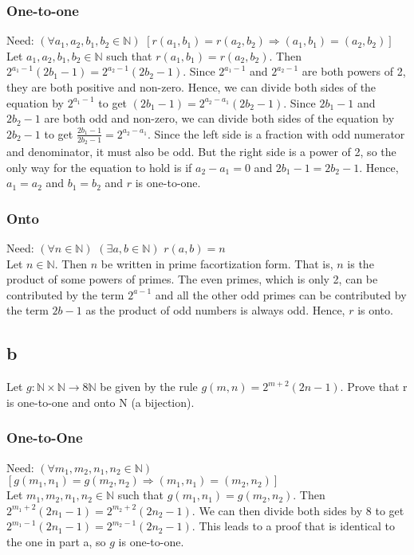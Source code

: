 \documentclass{article}
\begin{document}
\subsubsection*{One-to-one}
Need: $(\forall a_1,a_2,b_1,b_2 \in \mathbb{N})$ $[r(a_1, b_1) = r(a_2, b_2) \Rightarrow (a_1, b_1) = (a_2, b_2)]$ \\
Let $a_1, a_2, b_1, b_2 \in \mathbb{N}$ such that $r(a_1, b_1) = r(a_2, b_2)$. Then $2^{a_1-1}(2b_1-1) = 2^{a_2-1}(2b_2-1)$. Since $2^{a_1-1}$ and $2^{a_2-1}$ are both powers of 2, they are both positive and non-zero. Hence, we can divide both sides of the equation by $2^{a_1-1}$ to get $(2b_1-1) = 2^{a_2-a_1}(2b_2-1)$. Since $2b_1-1$ and $2b_2-1$ are both odd and non-zero, we can divide both sides of the equation by $2b_2-1$ to get $\frac{2b_1-1}{2b_2-1} = 2^{a_2-a_1}$. Since the left side is a fraction with odd numerator and denominator, it must also be odd. But the right side is a power of 2, so the only way for the equation to hold is if $a_2-a_1 = 0$ and $2b_1-1 = 2b_2-1$. Hence, $a_1 = a_2$ and $b_1 = b_2$ and $r$ is one-to-one. 
\subsubsection*{Onto}
Need: $(\forall n \in \mathbb{N})$ $(\exists a, b \in \mathbb{N})$ $r(a, b) = n$ \\
Let $n \in \mathbb{N}$. Then $n$ be written in prime facortization form. That is, $n$ is the product of some powers of primes. The even primes, which is only 2, can be contributed by the term $2^{a-1}$ and all the other odd primes can be contributed by the term $2b-1$ as the product of odd numbers is always odd. Hence, $r$ is onto.
\subsection*{b}
Let $g: \mathbb{N} \times \mathbb{N} \rightarrow 8\mathbb{N}$ be given by the rule $g(m,n) = 2^{m+2}(2n-1)$. Prove that r is one-to-one and onto N (a bijection).
\subsubsection*{One-to-One}
Need: $(\forall m_1,m_2,n_1,n_2 \in \mathbb{N})$ $[g(m_1, n_1) = g(m_2, n_2) \Rightarrow (m_1, n_1) = (m_2, n_2)]$ \\
Let $m_1, m_2, n_1, n_2 \in \mathbb{N}$ such that $g(m_1, n_1) = g(m_2, n_2)$. Then $2^{m_1+2}(2n_1-1) = 2^{m_2+2}(2n_2-1)$. We can then divide both sides by $8$ to get $2^{m_1-1}(2n_1-1) = 2^{m_2-1}(2n_2-1)$. This leads to a proof that is identical to the one in part a, so $g$ is one-to-one. 
\end{document}
